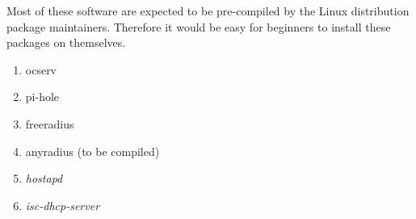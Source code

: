 \documentclass[12pt]{article}
\begin{document}
Most of these software are expected to be pre-compiled by the Linux distribution package maintainers. Therefore it would be easy for beginners to install these packages on themselves.

\begin{enumerate}
\item ocserv
\item pi-hole
\item freeradius
\item anyradius (to be compiled)
\item \textit{hostapd}
\item \textit{isc-dhcp-server}
\end{enumerate}
\end{document}
